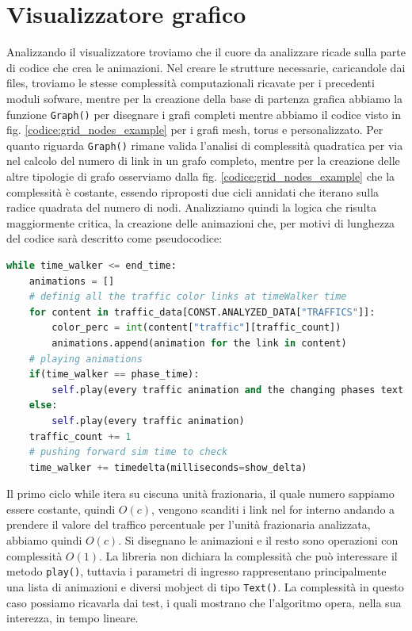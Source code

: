\documentclass[binding=0.6cm]{sapthesis}
\begin{document}
\section{Visualizzatore grafico}
Analizzando il visualizzatore troviamo che il cuore da analizzare ricade sulla parte di codice che crea le animazioni. Nel creare le strutture necessarie, caricandole dai files,
troviamo le stesse complessità computazionali ricavate per i precedenti moduli sofware, mentre per la creazione della base di partenza grafica abbiamo
la funzione \lstinline|Graph()| per disegnare i grafi completi mentre abbiamo il codice visto in fig. \ref{codice:grid_nodes_example} per i grafi mesh, torus e personalizzato.
Per quanto riguarda \lstinline|Graph()| rimane valida l'analisi di complessità quadratica per via nel calcolo del numero di link in un grafo completo, mentre per la creazione delle altre tipologie di grafo
osserviamo dalla fig. \ref{codice:grid_nodes_example} che la complessità è costante, essendo riproposti due cicli annidati che iterano sulla radice quadrata
del numero di nodi. 
Analizziamo quindi la logica che risulta maggiormente critica, la creazione delle animazioni che,
per motivi di lunghezza del codice sarà descritto come pseudocodice:

{\scriptsize
\begin{lstlisting}[language=Python, basicstyle=\ttfamily, caption={Logica creazione animazioni}, label={codice:create_animation}, breaklines=true]
while time_walker <= end_time:
    animations = []
    # definig all the traffic color links at timeWalker time
    for content in traffic_data[CONST.ANALYZED_DATA["TRAFFICS"]]:
        color_perc = int(content["traffic"][traffic_count])
        animations.append(animation for the link in content)
    # playing animations
    if(time_walker == phase_time):
        self.play(every traffic animation and the changing phases text animation)
    else:
        self.play(every traffic animation)
    traffic_count += 1
    # pushing forward sim time to check
    time_walker += timedelta(milliseconds=show_delta)
\end{lstlisting}
}

Il primo ciclo while itera su ciscuna unità frazionaria, il quale numero sappiamo essere costante, quindi \(O(c)\), vengono scanditi i link nel for interno andando a prendere il valore del traffico percentuale per l'unità frazionaria analizzata, abbiamo quindi \(O(c)\).
Si disegnano le animazioni e il resto sono operazioni con complessità \(O(1)\). La libreria non dichiara la complessità che può interessare il metodo \lstinline|play()|, tuttavia
i parametri di ingresso rappresentano principalmente una lista di animazioni e diversi mobject di tipo \lstinline|Text()|. 
La complessità in questo caso possiamo ricavarla dai test, i quali mostrano che l'algoritmo opera, nella sua interezza, in tempo lineare.
\end{document}

